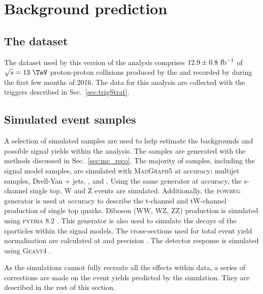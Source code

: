 \chapter{Background prediction} %
\label{chap:backgroundPred}

\section{The dataset} %
\label{sec:dataset}

The dataset used by this version of the analysis comprises
$12.9\pm0.8~\text{fb}^{-1}$ of $\sqrt{s}=13~\tev$ proton-proton collisions
produced by the \LHC and recorded by \CMS during the first few months
of 2016. The data for this analysis are collected with the triggers
described in Sec.~\ref{sec:trigStrat}.

\section{Simulated event samples} %
\label{sec:simEvents}

A selection of simulated \MC samples are used to help estimate the \SM
backgrounds and possible signal yields within the analysis. The samples are
generated with the methods discussed in Sec.~\ref{sec:mc_reco}. The
majority of samples, including the signal model samples, are simulated
with \textsc{MadGraph5} \cite{Alwall:2011uj,Alwall:2014hca} at \LO
accuracy: \QCD multijet samples, Drell-Yan + jets, \wj, \zj and \gj.
Using the same generator at \NLO accuracy, the s-channel single top,
{\ttbar}W and {\ttbar}Z events are simulated. Additionally, the
\textsc{powheg} \cite{Alioli:2010xd,Re:2010bp} generator is used at
\NLO accuracy to describe the t-channel and tW-channel production of
single top quarks. Diboson (WW, WZ, ZZ) production is simulated using
\textsc{pythia} 8.2 \cite{Sjostrand:2014zea}. This generator is also
used to simulate the decays of the sparticles within the signal
models. The cross-sections used for total event yield normalisation
are calculated at \NLO and \NNLO precision
\cite{Alwall:2011uj,Re:2010bp,Alioli:2009je,Gavin:2010az,Melia:2011tj,Czakon:2011xx,Gavin:2012sy}.
The detector response is simulated using \textsc{Geant4}
\cite{Agostinelli:2002hh}.

As the simulations cannot fully recreate all the effects within data, a
series of corrections are made on the event yields predicted by the
simulation. They are described in the rest of this section.

